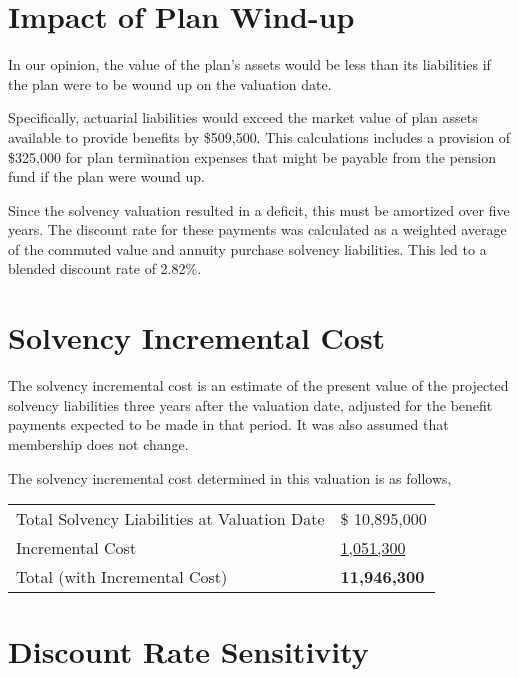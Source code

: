 \documentclass{report}
\begin{document}
\section{Impact of Plan Wind-up}

In our opinion, the value of the plan's assets would be less than its liabilities if the plan were to be wound up on the valuation date.

\vspace{3mm}
Specifically, actuarial liabilities would exceed the market value of plan assets available to provide benefits by \$509,500. This calculations includes a provision of \$325,000 for plan termination expenses that might be payable from the pension fund if the plan were wound up.

\vspace{3mm}
Since the solvency valuation resulted in a deficit, this must be amortized over five years. The discount rate for these payments was calculated as a weighted average of the commuted value and annuity purchase solvency liabilities. This led to a blended discount rate of 2.82\%.

\section{Solvency Incremental Cost}

The solvency incremental cost is an estimate of the present value of the projected solvency liabilities three years after the valuation date, adjusted for the benefit payments expected to be made in that period. It was also assumed that membership does not change.

The solvency incremental cost determined in this valuation is as follows,

\bgroup
\normalsize
\def\arraystretch{1.5}
\begin{longtable}[l]{p{10cm} p{6cm}}
Total Solvency Liabilities at Valuation Date & \hspace{3mm} \$ \hspace{5mm} 10,895,000 \\
Incremental Cost &  \hspace{7mm} \uline{\hspace{6mm} 1,051,300 } \\ 
Total (with Incremental Cost) & \hspace{12mm} \textbf{11,946,300 } \\
\end{longtable}
\egroup

\section{Discount Rate Sensitivity}
\end{document}
